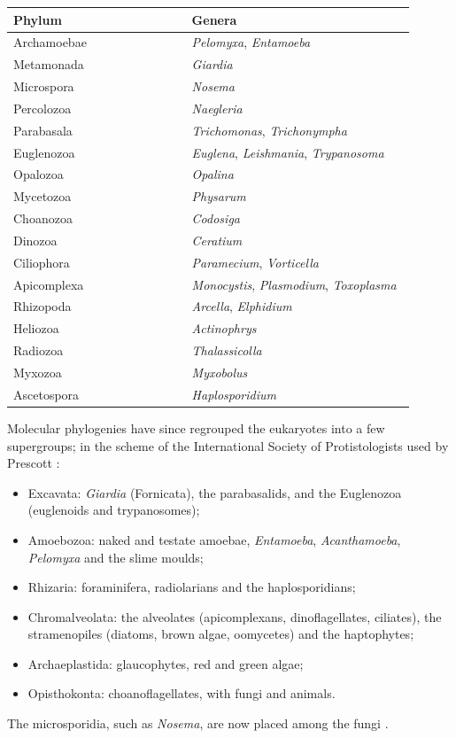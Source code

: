 \begin{center}
\begin{tabular}{p{0.4\linewidth}
p{0.5\linewidth}}
Phylum & Genera \\
\hline
Archamoebae & \emph{Pelomyxa},
\emph{Entamoeba} \\
Metamonada & \emph{Giardia} \\
Microspora & \emph{Nosema} \\
Percolozoa & \emph{Naegleria} \\
Parabasala & \emph{Trichomonas},
\emph{Trichonympha} \\
Euglenozoa & \emph{Euglena},
\emph{Leishmania}, \emph{Trypanosoma} \\
Opalozoa & \emph{Opalina} \\
Mycetozoa & \emph{Physarum} \\
Choanozoa & \emph{Codosiga} \\
Dinozoa & \emph{Ceratium} \\
Ciliophora & \emph{Paramecium},
\emph{Vorticella} \\
Apicomplexa & \emph{Monocystis},
\emph{Plasmodium}, \emph{Toxoplasma} \\
Rhizopoda & \emph{Arcella}, \emph{Elphidium}
\\
Heliozoa & \emph{Actinophrys} \\
Radiozoa & \emph{Thalassicolla} \\
Myxozoa & \emph{Myxobolus} \\
Ascetospora & \emph{Haplosporidium} \\
\end{tabular}
\end{center}

Molecular phylogenies have since regrouped
the eukaryotes into a few supergroups; in the
scheme of the International Society of
Protistologists used by Prescott
\cite[Chapter 25]{willey2008prescott}:
\begin{itemize}
\item Excavata: \emph{Giardia} (Fornicata),
the parabasalids, and the Euglenozoa
(euglenoids and trypanosomes);
\item Amoebozoa: naked and testate amoebae,
\emph{Entamoeba}, \emph{Acanthamoeba},
\emph{Pelomyxa} and the slime moulds;
\item Rhizaria: foraminifera, radiolarians
and the haplosporidians;
\item Chromalveolata: the alveolates
(apicomplexans, dinoflagellates, ciliates),
the stramenopiles (diatoms, brown algae,
oomycetes) and the haptophytes;
\item Archaeplastida: glaucophytes, red and
green algae;
\item Opisthokonta: choanoflagellates, with
fungi and animals.
\end{itemize}
The microsporidia, such as \emph{Nosema}, are
now placed among the fungi \cite[Chapter
26]{willey2008prescott}.

